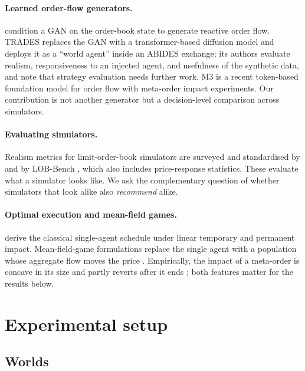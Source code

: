 \paragraph{Learned order-flow generators.} \citet{coletta2021towards} condition a GAN on the order-book state to generate reactive order flow. TRADES \citep{berti2025trades} replaces the GAN with a transformer-based diffusion model and deploys it as a ``world agent'' inside an ABIDES exchange; its authors evaluate realism, responsiveness to an injected agent, and usefulness of the synthetic data, and note that strategy evaluation needs further work. M3 \citep{zhang2026m3} is a recent token-based foundation model for order flow with meta-order impact experiments. Our contribution is not another generator but a decision-level comparison across simulators.

\paragraph{Evaluating simulators.} Realism metrics for limit-order-book simulators are surveyed and standardised by \citet{vyetrenko2020getreal} and by LOB-Bench \citep{nagy2025lobbench}, which also includes price-response statistics. These evaluate what a simulator looks like. We ask the complementary question of whether simulators that look alike also \emph{recommend} alike.

\paragraph{Optimal execution and mean-field games.} \citet{almgren2001optimal} derive the classical single-agent schedule under linear temporary and permanent impact. Mean-field-game formulations replace the single agent with a population whose aggregate flow moves the price \citep{cardaliaguet2018mean,huang2019mean,casgrain2020mean}. Empirically, the impact of a meta-order is concave in its size and partly reverts after it ends \citep{toth2011anomalous}; both features matter for the results below.

\section{Experimental setup}
\label{sec:setup}

\subsection{Worlds}

